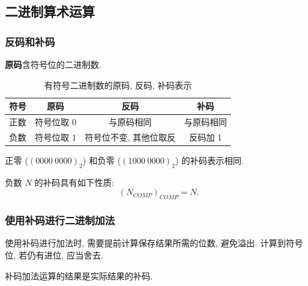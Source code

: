 \subsection{二进制算术运算}
\subsubsection{反码和补码}
\textbf{原码}\quad 含符号位的二进制数.

\begin{table}[H]
    \caption{有符号二进制数的原码, 反码, 补码表示}
    \centering
    \begin{tabular}{cccc} \toprule
        \bfseries 符号 & \bfseries 原码 & \bfseries 反码 & \bfseries 补码 \\\midrule
        正数           & 符号位取 0       & 与原码相同        & 与原码相同        \\
        负数           & 符号位取 1       & 符号位不变, 其他位取反 & 反码加 1        \\
        \bottomrule
    \end{tabular}
\end{table}

正零 ($(0000\ 0000)_2$) 和负零 ($(1000\ 0000)_2$) 的补码表示相同.

负数 $N$ 的补码具有如下性质:
\begin{equation}
    (N_{COMP})_{COMP}=N.
\end{equation}

\subsubsection{使用补码进行二进制加法}
使用补码进行加法时, 需要提前计算保存结果所需的位数, 避免溢出. 计算到符号位, 若仍有进位, 应当舍去.

补码加法运算的结果是实际结果的补码.
